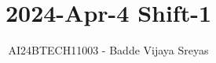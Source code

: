 \documentclass[journal]{IEEEtran}
\begin{document}

\vspace{3cm}

\title{2024-Apr-4 Shift-1}
\author{AI24BTECH11003 - Badde Vijaya Sreyas}
{\let\newpage\relax\maketitle}

\renewcommand{\thefigure}{\theenumi}
\renewcommand{\thetable}{\theenumi}
\setlength{\intextsep}{10pt} %


\renewcommand{\thetable}{\theenumi}
\end{document}
